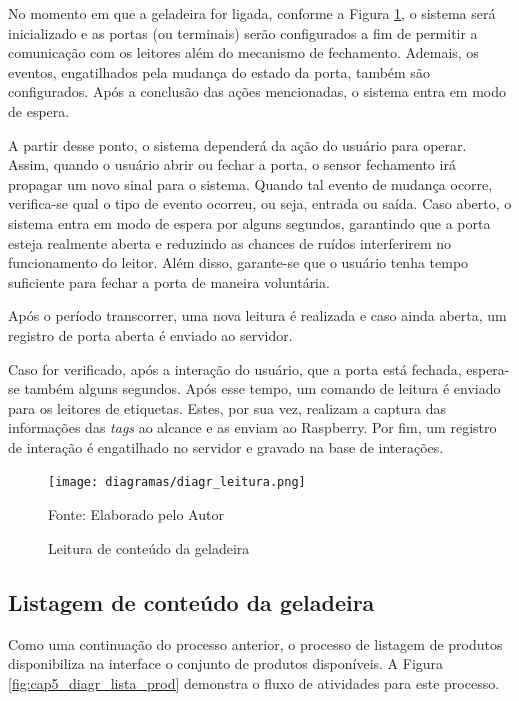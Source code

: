 No momento em que a geladeira for ligada, conforme a Figura \ref{fig:cap5_diagr_leitura}, o sistema será inicializado e as portas (ou terminais) serão configurados a fim de permitir a comunicação com os leitores além do mecanismo de fechamento. Ademais, os eventos, engatilhados pela mudança do estado da porta, também são configurados. Após a conclusão das ações mencionadas, o sistema entra em modo de espera.

A partir desse ponto, o sistema dependerá da ação do usuário para operar. Assim, quando o usuário abrir ou fechar a porta, o sensor fechamento irá propagar um novo sinal para o sistema. Quando tal evento de mudança ocorre, verifica-se qual o tipo de evento ocorreu, ou seja, entrada ou saída. Caso aberto, o sistema entra em modo de espera por alguns segundos, garantindo que a porta esteja realmente aberta e reduzindo as chances de ruídos interferirem no funcionamento do leitor. Além disso, garante-se que o usuário tenha tempo suficiente para fechar a porta de maneira voluntária. 

Após o período transcorrer, uma nova leitura é realizada e caso ainda aberta, um registro de porta aberta é enviado ao servidor. 

Caso for verificado, após a interação do usuário, que a porta está fechada, espera-se também alguns segundos. Após esse tempo, um comando de leitura é enviado para os leitores de etiquetas. Estes, por sua vez, realizam a captura das informações das \textit{tags} ao alcance e as enviam ao Raspberry. Por fim, um registro de interação é engatilhado no servidor e gravado na base de interações.

\begin{figure}[htb]
    \caption{Leitura de conteúdo da geladeira}
    \label{fig:cap5_diagr_leitura}
    \texttt{[image: diagramas/diagr\_leitura.png]}
    
    \footnotesize{Fonte: Elaborado pelo Autor}
\end{figure}

\subsection{Listagem de conteúdo da geladeira}

Como uma continuação do processo anterior, o processo de listagem de produtos disponibiliza na interface o conjunto de produtos disponíveis. A Figura \ref{fig:cap5_diagr_lista_prod} demonstra o fluxo de atividades para este processo.

